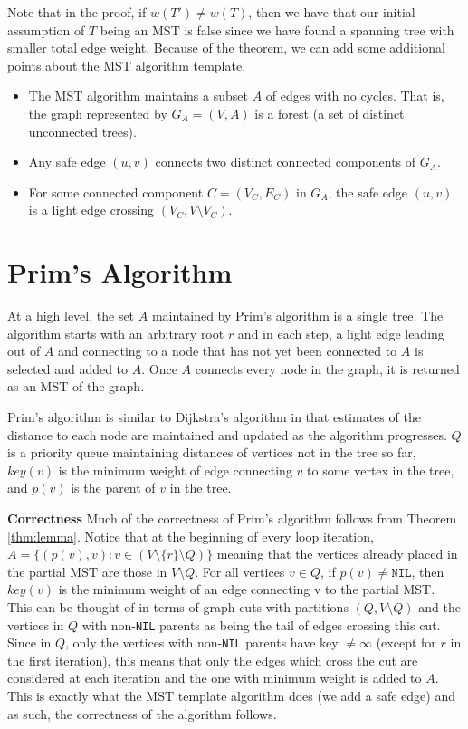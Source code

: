 \documentclass [12pt]{article}
\theoremstyle{definition}
\begin{document}
Note that in the proof, if $w(T') \neq w(T)$, then we have that our initial assumption of $T$ being an MST is false since we have found a spanning tree with smaller total edge weight. Because of the theorem, we can add some additional points about the MST algorithm template. 

\begin{itemize}
    \item The MST algorithm maintains a subset $A$ of edges with no cycles. That is, the graph represented by $G_A = (V, A)$ is a forest (a set of distinct unconnected trees). 
    \item Any safe edge $(u, v )$ connects two distinct connected components of $G_A$. 
    \item For some connected component $C = (V_C, E_C)$ in $G_A$, the safe edge $(u, v )$ is a light edge crossing $(V_C, V \setminus V_C)$.
\end{itemize}

\section{Prim's Algorithm}
 
At a high level, the set $A$ maintained by Prim's algorithm is a single tree. The algorithm starts with an arbitrary root $r$ and in each step, a light edge leading out of $A$ and connecting to a node that has not yet been connected to $A$ is selected and added to $A$. Once $A$ connects every node in the graph, it is returned as an MST of the graph. 

Prim's algorithm is similar to Dijkstra's algorithm in that estimates of the distance to each
node are maintained and updated as the algorithm progresses. $Q$ is a priority queue maintaining distances of vertices not in the tree so far, $key(v )$ is the minimum weight of edge connecting $v$ to some vertex in the tree, and $p(v )$ is the parent of $v$ in the tree.

\textbf{Correctness} Much of the correctness of Prim's algorithm follows from Theorem \ref{thm:lemma}. Notice that at the beginning of every loop iteration, $A = \{ (p(v ), v ) : v \in (V \setminus  \{r\} \setminus  Q)\}$ meaning that the vertices already placed in the partial MST are those in $V \setminus Q$. For all vertices $v \in Q$, if $p(v ) \neq \texttt{NIL}$, then $key(v )$ is the minimum weight of an edge connecting v to the partial MST. This can be thought of in terms of graph cuts with partitions $(Q, V \setminus Q)$ and the vertices in $Q$ with non-\texttt{NIL} parents as being the tail of edges crossing this cut. Since in $Q$,
only the vertices with non-\texttt{NIL} parents have key $\neq \infty$ (except for $r$ in the first iteration), this means that only the edges which cross the cut are considered at each iteration and the one with minimum weight is added to $A$. This is exactly what the MST template algorithm does (we add a safe edge) and as such, the correctness of the algorithm follows.
\end{document}
